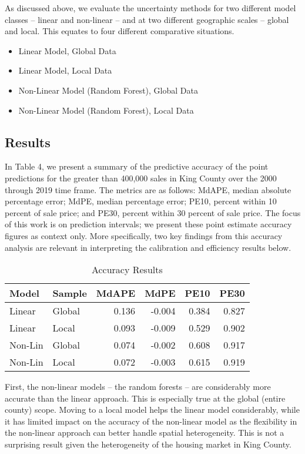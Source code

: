 \documentclass[colTwo]{format}
\theoremstyle{definition}
\begin{document}
As discussed above, we evaluate the uncertainty methods for two different model classes -- linear and non-linear -- and at two different geographic scales -- global and local.  This equates to four different comparative situations. 

\begin{itemize}
\item Linear Model, Global Data
\item Linear Model, Local Data
\item Non-Linear Model (Random Forest), Global Data
\item Non-Linear Model (Random Forest), Local Data
\end{itemize}

\subsection{Results}

In Table 4, we present a summary of the predictive accuracy of the point predictions for the greater than 400,000 sales in King County over the 2000 through 2019 time frame. The metrics are as follows: MdAPE, median absolute percentage error; MdPE, median percentage error; PE10, percent within 10 percent of sale price; and PE30, percent within 30 percent of sale price.  The focus of this work is on prediction intervals; we present these point estimate accuracy figures as context only.  More specifically, two key findings from this accuracy analysis are relevant in interpreting the calibration and efficiency results below. 

\begin{table}[h!]
\centering
\begin{tabular}{l|l|r|r|r|r}
\hline
\textbf{Model} & \textbf{Sample} & \textbf{MdAPE} & \textbf{MdPE} & \textbf{PE10} & \textbf{PE30}\\
\hline
Linear & Global & 0.136 & -0.004 & 0.384 & 0.827\\
Linear & Local & 0.093 & -0.009 & 0.529 & 0.902\\
\hline
Non-Lin & Global & 0.074 & -0.002 & 0.608 & 0.917\\
Non-Lin & Local & 0.072 & -0.003 & 0.615 & 0.919\\
\hline
\end{tabular}
\caption{Accuracy Results}
\label{table:4}
\end{table}

First, the non-linear models -- the random forests -- are considerably more accurate than the linear approach. This is especially true at the global (entire county) scope.  Moving to a local model helps the linear model considerably, while it has limited impact on the accuracy of the non-linear model as the flexibility in the non-linear approach can better handle spatial heterogeneity.  This is not a surprising result given the heterogeneity of the housing market in King County.  
\end{document}
